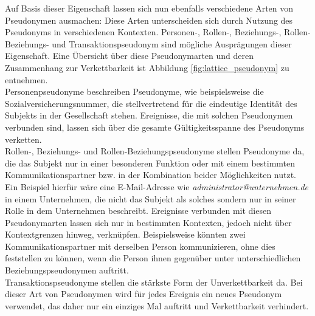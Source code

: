 Auf Basis dieser Eigenschaft lassen sich nun ebenfalls verschiedene Arten von Pseudonymen ausmachen:
Diese Arten unterscheiden sich durch Nutzung des Pseudonyms in verschiedenen Kontexten. Personen-, Rollen-, Beziehungs-, Rollen-Beziehungs- und Transaktionspseudonym sind mögliche Ausprägungen dieser Eigenschaft. Eine Übersicht über diese Pseudonymarten und deren Zusammenhang zur Verkettbarkeit ist Abbildung \ref{fig:lattice_pseudonym} zu entnehmen.\\
Personenpseudonyme beschreiben Pseudonyme, wie beispielsweise die Sozialversicherungsnummer, die stellvertretend für die eindeutige Identität des Subjekts in der Gesellschaft stehen. Ereignisse, die mit solchen Pseudonymen verbunden sind, lassen sich über die gesamte Gültigkeitsspanne des Pseudonyms verketten. \\
Rollen-, Beziehungs- und Rollen-Beziehungspseudonyme stellen Pseudonyme da, die das Subjekt nur in einer besonderen Funktion oder mit einem bestimmten Kommunikationspartner bzw. in der Kombination beider Möglichkeiten nutzt. Ein Beispiel hierfür wäre eine E-Mail-Adresse wie \textit{administrator@unternehmen.de} in einem Unternehmen, die nicht das Subjekt als solches sondern nur in seiner Rolle in dem Unternehmen beschreibt. Ereignisse verbunden mit diesen Pseudonymarten lassen sich nur in bestimmten Kontexten, jedoch nicht über Kontextgrenzen hinweg, verknüpfen. Beispielsweise könnten zwei Kommunikationspartner mit derselben Person kommunizieren, ohne dies feststellen zu können, wenn die Person ihnen gegenüber unter unterschiedlichen Beziehungspseudonymen auftritt.\\
Transaktionspseudonyme stellen die stärkste Form der Unverkettbarkeit da. Bei dieser Art von Pseudonymen wird für jedes Ereignis ein neues Pseudonym verwendet, das daher nur ein einziges Mal auftritt und Verkettbarkeit verhindert.



